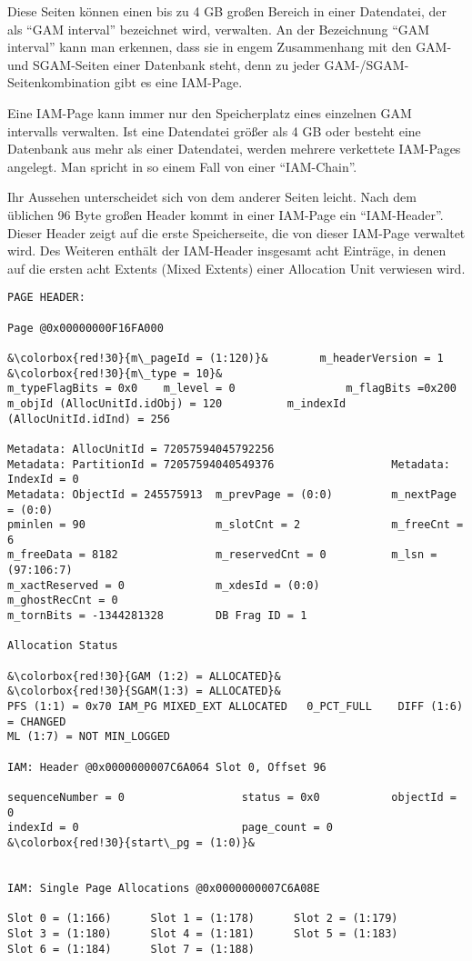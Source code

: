         Diese Seiten können einen bis zu 4 GB großen Bereich in einer
        Datendatei, der als \enquote{GAM interval} bezeichnet wird, verwalten.
        An der Bezeichnung \enquote{GAM interval} kann man erkennen, dass sie in
        engem Zusammenhang mit den GAM- und SGAM-Seiten einer Datenbank steht,
        denn zu jeder GAM-/SGAM-Seitenkombination gibt es eine IAM-Page.
        \begin{merke}
          Eine IAM-Page kann immer nur den Speicherplatz eines einzelnen GAM
          intervalls verwalten. Ist eine Datendatei größer als 4 GB oder besteht
          eine Datenbank aus mehr als einer Datendatei, werden mehrere
          verkettete IAM-Pages angelegt. Man spricht in so einem Fall von einer
          \enquote{IAM-Chain}.
        \end{merke}         
        Ihr Aussehen unterscheidet sich von dem anderer Seiten leicht. Nach dem
        üblichen 96 Byte großen Header kommt in einer IAM-Page ein
        \enquote{IAM-Header}. Dieser Header zeigt auf die erste Speicherseite,
        die von dieser IAM-Page verwaltet wird. Des Weiteren enthält der
        IAM-Header insgesamt acht Einträge, in denen auf die ersten acht Extents
        (Mixed Extents) einer Allocation Unit verwiesen wird.
        \begin{lstlisting}[language=terminal,caption={Inhalt eines IAM-Page
        Headers}, label=admin05_01]
PAGE HEADER:

Page @0x00000000F16FA000

&\colorbox{red!30}{m\_pageId = (1:120)}&        m_headerVersion = 1         &\colorbox{red!30}{m\_type = 10}&
m_typeFlagBits = 0x0    m_level = 0                 m_flagBits =0x200 
m_objId (AllocUnitId.idObj) = 120          m_indexId (AllocUnitId.idInd) = 256

Metadata: AllocUnitId = 72057594045792256 
Metadata: PartitionId = 72057594040549376                  Metadata: IndexId = 0
Metadata: ObjectId = 245575913  m_prevPage = (0:0)         m_nextPage = (0:0) 
pminlen = 90                    m_slotCnt = 2              m_freeCnt = 6
m_freeData = 8182               m_reservedCnt = 0          m_lsn = (97:106:7)
m_xactReserved = 0              m_xdesId = (0:0)           m_ghostRecCnt = 0
m_tornBits = -1344281328        DB Frag ID = 1                      

Allocation Status

&\colorbox{red!30}{GAM (1:2) = ALLOCATED}&             &\colorbox{red!30}{SGAM(1:3) = ALLOCATED}&
PFS (1:1) = 0x70 IAM_PG MIXED_EXT ALLOCATED   0_PCT_FULL    DIFF (1:6) = CHANGED
ML (1:7) = NOT MIN_LOGGED           

IAM: Header @0x0000000007C6A064 Slot 0, Offset 96

sequenceNumber = 0                  status = 0x0           objectId = 0
indexId = 0                         page_count = 0                     
&\colorbox{red!30}{start\_pg = (1:0)}&


IAM: Single Page Allocations @0x0000000007C6A08E

Slot 0 = (1:166)      Slot 1 = (1:178)      Slot 2 = (1:179)
Slot 3 = (1:180)      Slot 4 = (1:181)      Slot 5 = (1:183)
Slot 6 = (1:184)      Slot 7 = (1:188)                    
\end{lstlisting}

